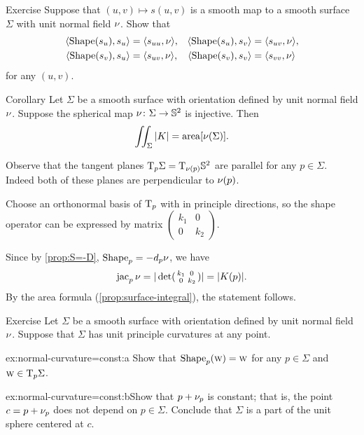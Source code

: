 \begin{thm}{Exercise}\label{ex:shape-chart}
Suppose that $(u,v)\mapsto s(u,v)$ is a smooth map to a smooth surface $\Sigma$ with unit normal field $\nu$.
Show that 
\begin{align*}
\langle \mathop{\rm Shape}\nolimits(s_u), s_u\rangle 
&=\langle s_{uu},\nu\rangle,
&
\langle \mathop{\rm Shape}\nolimits(s_u), s_v\rangle 
&=\langle s_{uv},\nu\rangle,
\\
\langle \mathop{\rm Shape}\nolimits(s_v), s_u\rangle 
&=\langle s_{uv},\nu\rangle,
&
\langle \mathop{\rm Shape}\nolimits(s_v), s_v\rangle 
&=\langle s_{vv},\nu\rangle
\end{align*}
for any $(u,v)$.

\end{thm}

\begin{thm}{Corollary}\label{cor:intK}
Let $\Sigma$ be a smooth surface with orientation defined by unit normal field $\nu$.
Suppose the spherical map $\nu\colon\Sigma\to\mathbb{S}^2$ is injective.
Then 
\[\iint_\Sigma|K|=\mathop{\rm area}\nolimits[\nu(\Sigma)].\]
\end{thm}

Observe that the tangent planes $\mathrm{T}_p\Sigma=\mathrm{T}_{\nu(p)}\mathbb{S}^2$ are parallel for any $p\in\Sigma$.
Indeed both of these planes are perpendicular to $\nu(p)$. 


Choose an orthonormal basis of $\mathrm{T}_p$ with in principle directions,
so the shape operator can be expressed by matrix 
$(\begin{smallmatrix}
   k_1
   &0
   \\
   0
   &k_2
  \end{smallmatrix})$.

Since by \ref{prop:S=-D}, $\mathop{\rm Shape}\nolimits_p=-d_p\nu$, we have
\[\mathop{\rm jac}\nolimits_p\nu=|\det(\begin{smallmatrix}
   k_1
   &0
   \\
   0
   &k_2
  \end{smallmatrix})|=|K(p)|.\]
By the area formula (\ref{prop:surface-integral}), the statement follows.
\qeds


\begin{thm}{Exercise}\label{ex:normal-curvature=const}
Let $\Sigma$ be a smooth surface with orientation defined by unit normal field $\nu$.
Suppose that $\Sigma$ has unit principle curvatures at any point.

\begin{subthm}{ex:normal-curvature=const:a} Show that $\mathop{\rm Shape}\nolimits_p(\textsc w)=\textsc w$ for any $p\in\Sigma$ and $\textsc w\in \mathrm{T}_p\Sigma$.
\end{subthm}

\begin{subthm}{ex:normal-curvature=const:b}Show that $p+\nu_p$ is constant; that is, the point $c=p+\nu_p$ does not depend on $p\in\Sigma$.
Conclude that $\Sigma$ is a part of the unit sphere centered at $c$.
\end{subthm}

\end{thm}

